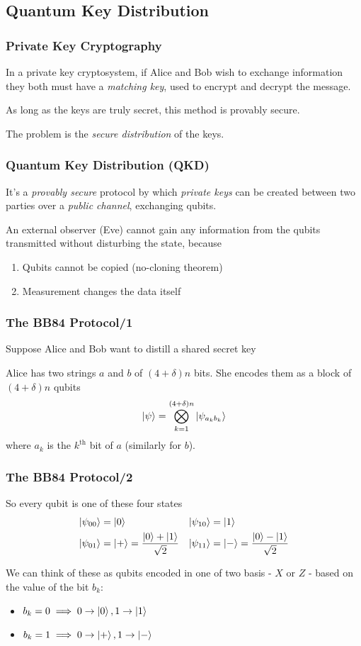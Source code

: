 \documentclass{beamer}
\begin{document}
  \subsection{Quantum Key Distribution}
  \begin{frame}
    \frametitle{Private Key Cryptography}
    In a private key cryptosystem, if Alice and Bob wish to exchange information they
    both must have a \textit{matching key}, used to encrypt and decrypt the message.

    As long as the keys are truly secret, this method is provably secure.

    The problem is the \textit{secure distribution}
    of the keys.
  \end{frame}
  \begin{frame}
    \frametitle{Quantum Key Distribution (QKD)}
    It's a \textit{provably secure} protocol by which \textit{private keys} can be created
    between two parties over a \textit{public channel}, exchanging qubits.

    An external observer (Eve) cannot gain any information from the qubits
    transmitted without disturbing the state, because
    \begin{enumerate}
      \item<1-> Qubits cannot be copied (no-cloning theorem)
      \item<2-> Measurement changes the data itself
    \end{enumerate}
  \end{frame}
  \begin{frame}
    \frametitle{The BB84 Protocol/1}
    Suppose Alice and Bob want to distill a shared secret key
    
    Alice has two strings $a$ and $b$ of $(4+\delta)n$ bits.
    She encodes them as a block of $(4+\delta)n$ qubits
    \begin{equation*}
      \ket{\psi} = \bigotimes_{k=1}^{(4+\delta)n} \ket{\psi_{a_kb_k}}
    \end{equation*}
    where $a_k$ is the $k^\text{th}$ bit of $a$ (similarly for $b$).
  \end{frame}

  \begin{frame}
    \frametitle{The BB84 Protocol/2}
    So every qubit is one of these four states
    \begin{align*}
      \ket{\psi_{00}} &= \ket{0} & \ket{\psi_{10}} &= \ket{1} \\
      \ket{\psi_{01}} &= \ket{+} = \frac{\ket0 + \ket1}{\sqrt2} &\ket{\psi_{11}} &= \ket{-} = \frac{\ket0 - \ket1}{\sqrt2}
    \end{align*}

    We can think of these as qubits encoded in one of two basis - $X$ or $Z$ - based
    on the value of the bit $b_k$:
    \begin{itemize}
      \item $b_k = 0 \implies 0 \to \ket0, 1 \to \ket1$
      \item $b_k = 1 \implies 0 \to \ket{+}, 1 \to \ket{-}$
    \end{itemize}
  \end{frame}
\end{document}
